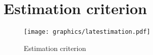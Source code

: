 \section{Estimation criterion}
\label{sec:est_criterion}
\begin{figure}[h]
\centering%
\texttt{[image: graphics/latestimation.pdf]}
\caption{
   Estimation criterion
   \label{fig:est-criterion}
   }
\end{figure}

